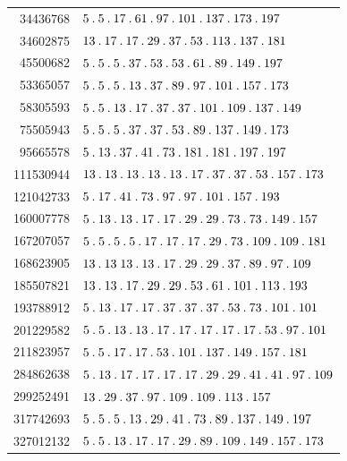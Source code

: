 \begin{longtable}{@{}r|l@{}}
34436768 & $5\pdot 5\pdot 17\pdot 61\pdot 97\pdot 101\pdot 137\pdot 173\pdot 197$\\
34602875 & $13\pdot 17\pdot 17\pdot 29\pdot 37\pdot 53\pdot 113\pdot 137\pdot 181$\\
45500682 & $5\pdot 5\pdot 5\pdot 37\pdot 53\pdot 53\pdot 61\pdot 89\pdot 149\pdot 197$\\
53365057 & $5\pdot 5\pdot 5\pdot 13\pdot 37\pdot 89\pdot 97\pdot 101\pdot 157\pdot 173$\\
58305593 & $5\pdot 5\pdot 13\pdot 17\pdot 37\pdot 37\pdot 101\pdot 109\pdot 137\pdot 149$\\
75505943 & $5\pdot 5\pdot 5\pdot 37\pdot 37\pdot 53\pdot 89\pdot 137\pdot 149\pdot 173$\\
95665578 & $5\pdot 13\pdot 37\pdot 41\pdot 73\pdot 181\pdot 181\pdot 197\pdot 197$\\
111530944 & $13\pdot 13\pdot 13\pdot 13\pdot 13\pdot 17\pdot 37\pdot 37\pdot 53\pdot 157\pdot 173$\\
121042733 & $5\pdot 17\pdot 41\pdot 73\pdot 97\pdot 97\pdot 101\pdot 157\pdot 193$\\
160007778 & $5\pdot 13\pdot 13\pdot 17\pdot 17\pdot 29\pdot 29\pdot 73\pdot 73\pdot 149\pdot 157$\\
167207057 & $5\pdot 5\pdot 5\pdot 5\pdot 17\pdot 17\pdot 17\pdot 29\pdot 73\pdot 109\pdot 109\pdot 181$\\
168623905 & $13\pdot 13\;13\pdot 13\pdot 17\pdot 29\pdot 29\pdot 37\pdot 89\pdot 97\pdot 109$\\
185507821 & $13\pdot 13\pdot 17\pdot 29\pdot 29\pdot 53\pdot 61\pdot 101\pdot 113\pdot 193$\\
193788912 & $5\pdot 13\pdot 17\pdot 17\pdot 37\pdot 37\pdot 37\pdot 53\pdot 73\pdot 101\pdot 101$\\
201229582 & $5\pdot 5\pdot 13\pdot 13\pdot 17\pdot 17\pdot 17\pdot 17\pdot 17\pdot 53\pdot 97\pdot 101$\\
211823957 & $5\pdot 5\pdot 17\pdot 17\pdot 53\pdot 101\pdot 137\pdot 149\pdot 157\pdot 181$\\
284862638 & $5\pdot 13\pdot 17\pdot 17\pdot 17\pdot 17\pdot 29\pdot 29\pdot 41\pdot 41\pdot 97\pdot 109$\\
299252491 & $13\pdot 29\pdot 37\pdot 97\pdot 109\pdot 109\pdot 113\pdot 157$\\
317742693 & $5\pdot 5\pdot 5\pdot 13\pdot 29\pdot 41\pdot 73\pdot 89\pdot 137\pdot 149\pdot 197$\\
327012132 & $5\pdot 5\pdot 13\pdot 17\pdot 17\pdot 29\pdot 89\pdot 109\pdot 149\pdot 157\pdot 173$\\

\end{longtable}
